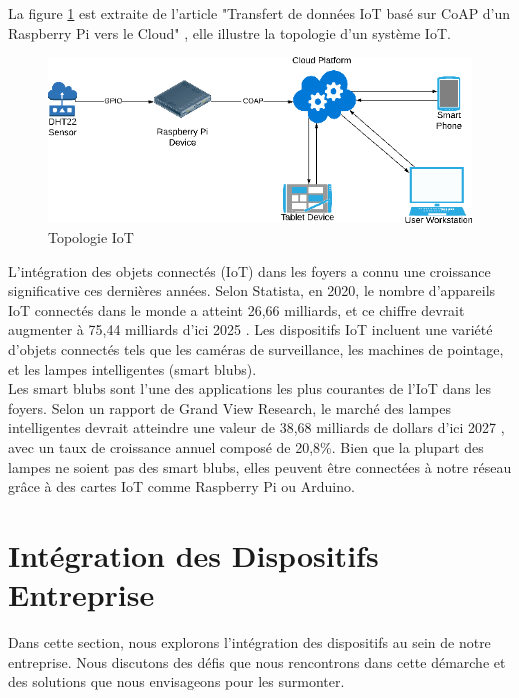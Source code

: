 La figure \ref{Chap4.2.1} est extraite de l'article "Transfert de données IoT basé sur CoAP d'un Raspberry Pi vers le Cloud" \cite{Scott2019CoAPBI}, elle illustre la topologie d'un système IoT.

\begin{figure}[H]
\centering
\includegraphics[width=15cm]{Images/IoT-Topo2.png}
\caption{Topologie IoT}
\label{Chap4.2.1}
\end{figure}


L'intégration des objets connectés (IoT) dans les foyers a connu une croissance significative ces dernières années. Selon Statista, en 2020, le nombre d'appareils IoT connectés dans le monde a atteint 26,66 milliards, et ce chiffre devrait augmenter à 75,44 milliards d'ici 2025 \cite{statista-iot-2025}. Les dispositifs IoT incluent une variété d'objets connectés tels que les caméras de surveillance, les machines de pointage, et les lampes intelligentes (smart blubs). \\

Les smart blubs sont l'une des applications les plus courantes de l'IoT dans les foyers. Selon un rapport de Grand View Research, le marché des lampes intelligentes devrait atteindre une valeur de 38,68 milliards de dollars d'ici 2027 \cite{market-splash-automation}, avec un taux de croissance annuel composé de 20,8\%. Bien que la plupart des lampes ne soient pas des smart blubs, elles peuvent être connectées à notre réseau grâce à des cartes IoT comme Raspberry Pi ou Arduino.\\


\section{Intégration des Dispositifs Entreprise}

Dans cette section, nous explorons l'intégration des dispositifs au sein de notre entreprise. Nous discutons des défis que nous rencontrons dans cette démarche et des solutions que nous envisageons pour les surmonter.

